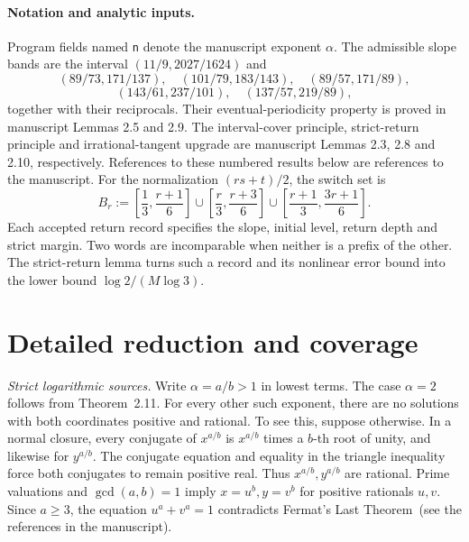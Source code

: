 \documentclass[11pt,a4paper]{article}
\begin{document}
\paragraph{Notation and analytic inputs.}
Program fields named \texttt{n} denote the manuscript exponent $\alpha$.
The admissible slope bands are the interval $(11/9,2027/1624)$ and
\[
(89/73,171/137),\quad(101/79,183/143),\quad(89/57,171/89),
\]
\[
(143/61,237/101),\quad(137/57,219/89),
\]
together with their reciprocals. Their eventual-periodicity property is
proved in manuscript Lemmas 2.5 and 2.9. The interval-cover principle,
strict-return principle and irrational-tangent upgrade are manuscript
Lemmas 2.3, 2.8 and 2.10, respectively. References to these numbered results
below are references to the manuscript.
For the normalization $(rs+t)/2$, the switch set is
\[
B_r:=\left[\frac13,\frac{r+1}{6}\right]\cup
\left[\frac r3,\frac{r+3}{6}\right]\cup
\left[\frac{r+1}{3},\frac{3r+1}{6}\right].
\]
Each accepted return record specifies the slope, initial level, return
depth and strict margin. Two words are incomparable when neither is a
prefix of the other. The strict-return lemma turns such a record and its
nonlinear error bound into the lower bound $\log2/(M\log3)$.

\section{Detailed reduction and coverage}

\emph{Strict logarithmic sources.}
Write \(\alpha=a/b>1\) in lowest terms. The case \(\alpha=2\) follows from
Theorem~2.11. For every other such exponent,
there are no solutions with both coordinates positive and rational.
To see this, suppose otherwise. In a normal closure, every conjugate
of \(x^{a/b}\) is \(x^{a/b}\) times a \(b\)-th root of unity, and
likewise for \(y^{a/b}\). The conjugate equation and equality in the
triangle inequality force both conjugates to remain positive real.
Thus \(x^{a/b},y^{a/b}\) are rational. Prime valuations and
\(\gcd(a,b)=1\) imply \(x=u^b,y=v^b\) for positive rationals
\(u,v\). Since \(a\geq3\), the equation \(u^a+v^a=1\) contradicts
Fermat's Last Theorem~(see the references in the manuscript).
\end{document}
